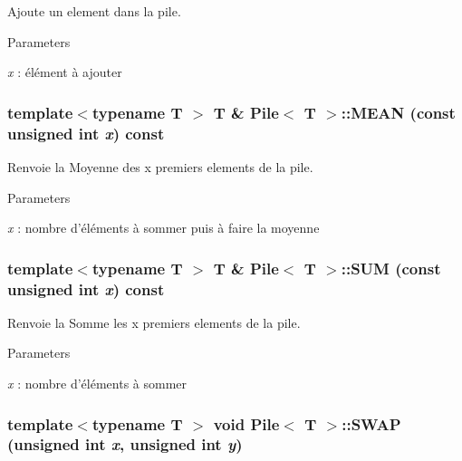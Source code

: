 Ajoute un element dans la pile. 


\begin{DoxyParams}{Parameters}
\item[{\em x}]: élément à ajouter \end{DoxyParams}
\hypertarget{classPile_a5b576fb2729b6f1d79c05b8932b91588}{
\subsubsection[{MEAN}]{\setlength{\rightskip}{0pt plus 5cm}template$<$typename T $>$ T \& {\bf Pile}$<$ T $>$::MEAN (const unsigned int {\em x}) const}}
\label{classPile_a5b576fb2729b6f1d79c05b8932b91588}


Renvoie la Moyenne des x premiers elements de la pile. 


\begin{DoxyParams}{Parameters}
\item[{\em x}]: nombre d'éléments à sommer puis à faire la moyenne \end{DoxyParams}
\hypertarget{classPile_a35fc6cd5606215120f150629315c615a}{
\subsubsection[{SUM}]{\setlength{\rightskip}{0pt plus 5cm}template$<$typename T $>$ T \& {\bf Pile}$<$ T $>$::SUM (const unsigned int {\em x}) const}}
\label{classPile_a35fc6cd5606215120f150629315c615a}


Renvoie la Somme les x premiers elements de la pile. 


\begin{DoxyParams}{Parameters}
\item[{\em x}]: nombre d'éléments à sommer \end{DoxyParams}
\hypertarget{classPile_a685bd6ecb5c0c7805e4aa9f45e7a1289}{
\subsubsection[{SWAP}]{\setlength{\rightskip}{0pt plus 5cm}template$<$typename T $>$ void {\bf Pile}$<$ T $>$::SWAP (unsigned int {\em x}, \/  unsigned int {\em y})}}
\label{classPile_a685bd6ecb5c0c7805e4aa9f45e7a1289}


